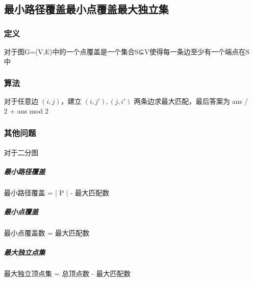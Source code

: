 ﻿\subsection{最小路径覆盖最小点覆盖最大独立集}
	\subsubsection{定义}
		对于图G=(V,E)中的一个点覆盖是一个集合S⊆V使得每一条边至少有一个端点在S中
	\subsubsection{算法}
		对于任意边 $ (i, j) $，建立 $ (i, j'),  (j, i') $  两条边求最大匹配，最后答案为 ans / 2 + ans mod 2
	\subsubsection{其他问题}
		\paragraph{}
			对于二分图
				\subparagraph{最小路径覆盖} 					
					最小路径覆盖 = | P | - 最大匹配数
				\subparagraph{最小点覆盖}
					最小点覆盖数 = 最大匹配数
				\subparagraph{最大独立点集}
				最大独立顶点集 = 总顶点数 - 最大匹配数